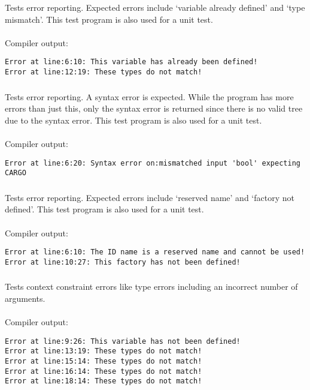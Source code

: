 \subsubsection*{}
Tests error reporting. Expected errors include `variable already defined' and `type mismatch'. This test program is also used for a unit test. \\
\\
Compiler output:
\begin{lstlisting}
Error at line:6:10: This variable has already been defined!
Error at line:12:19: These types do not match!
\end{lstlisting}

\subsubsection*{}
Tests error reporting. A syntax error is expected. While the program has more errors than just this, only the syntax error is returned since there is no valid tree due to the syntax error. This test program is also used for a unit test. \\
\\
Compiler output:
\begin{lstlisting}
Error at line:6:20: Syntax error on:mismatched input 'bool' expecting CARGO
\end{lstlisting}

\subsubsection*{}
Tests error reporting. Expected errors include `reserved name' and `factory not defined'. This test program is also used for a unit test. \\
\\
Compiler output:
\begin{lstlisting}
Error at line:6:10: The ID name is a reserved name and cannot be used!
Error at line:10:27: This factory has not been defined!
\end{lstlisting}

\subsubsection*{}
Tests context constraint errors like type errors including an incorrect number of arguments. \\
\\
Compiler output:
\begin{lstlisting}
Error at line:9:26: This variable has not been defined!
Error at line:13:19: These types do not match!
Error at line:15:14: These types do not match!
Error at line:16:14: These types do not match!
Error at line:18:14: These types do not match!
\end{lstlisting}

